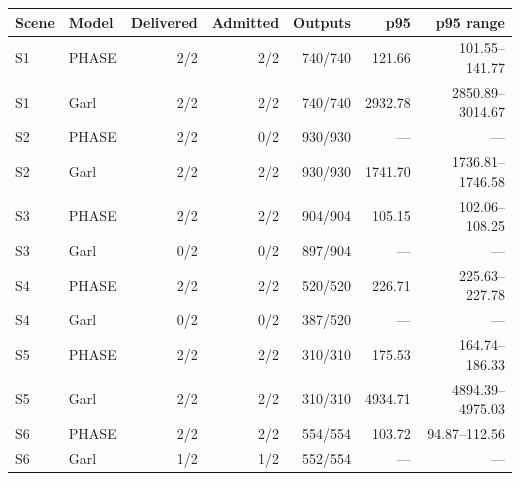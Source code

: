 \begin{tabular}{llrrrrr}
\toprule
Scene & Model & Delivered & Admitted & Outputs & p95 & p95 range \\
\midrule
S1 & PHASE & 2/2 & 2/2 & 740/740 & 121.66 & 101.55--141.77 \\
S1 & Garl & 2/2 & 2/2 & 740/740 & 2932.78 & 2850.89--3014.67 \\
S2 & PHASE & 2/2 & 0/2 & 930/930 & --- & --- \\
S2 & Garl & 2/2 & 2/2 & 930/930 & 1741.70 & 1736.81--1746.58 \\
S3 & PHASE & 2/2 & 2/2 & 904/904 & 105.15 & 102.06--108.25 \\
S3 & Garl & 0/2 & 0/2 & 897/904 & --- & --- \\
S4 & PHASE & 2/2 & 2/2 & 520/520 & 226.71 & 225.63--227.78 \\
S4 & Garl & 0/2 & 0/2 & 387/520 & --- & --- \\
S5 & PHASE & 2/2 & 2/2 & 310/310 & 175.53 & 164.74--186.33 \\
S5 & Garl & 2/2 & 2/2 & 310/310 & 4934.71 & 4894.39--4975.03 \\
S6 & PHASE & 2/2 & 2/2 & 554/554 & 103.72 & 94.87--112.56 \\
S6 & Garl & 1/2 & 1/2 & 552/554 & --- & --- \\
\bottomrule
\end{tabular}
